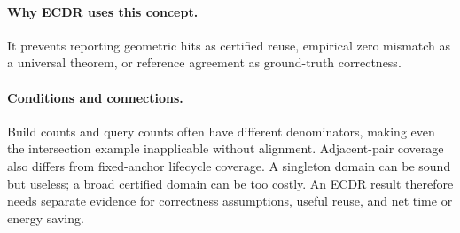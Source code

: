 \paragraph{Why ECDR uses this concept.}
It prevents reporting geometric hits as certified reuse, empirical zero mismatch as a universal theorem, or reference agreement as ground-truth correctness.
\paragraph{Conditions and connections.}
Build counts and query counts often have different denominators, making even the intersection example inapplicable without alignment. Adjacent-pair coverage also differs from fixed-anchor lifecycle coverage. A singleton domain can be sound but useless; a broad certified domain can be too costly. An ECDR result therefore needs separate evidence for correctness assumptions, useful reuse, and net time or energy saving.
